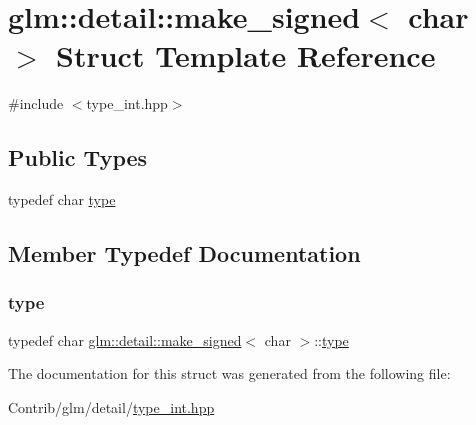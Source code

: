 \hypertarget{structglm_1_1detail_1_1make__signed_3_01char_01_4}{}\section{glm\+:\+:detail\+:\+:make\+\_\+signed$<$ char $>$ Struct Template Reference}
\label{structglm_1_1detail_1_1make__signed_3_01char_01_4}


{\ttfamily \#include $<$type\+\_\+int.\+hpp$>$}

\subsection*{Public Types}
\begin{DoxyCompactItemize}
\item 
typedef char \mbox{\hyperlink{structglm_1_1detail_1_1make__signed_3_01char_01_4_ad92111512e0af83393df0905896d478f}{type}}
\end{DoxyCompactItemize}


\subsection{Member Typedef Documentation}
\mbox{\label{structglm_1_1detail_1_1make__signed_3_01char_01_4_ad92111512e0af83393df0905896d478f}} 
\subsubsection{\texorpdfstring{type}{type}}
{\footnotesize\ttfamily typedef char \mbox{\hyperlink{structglm_1_1detail_1_1make__signed}{glm\+::detail\+::make\+\_\+signed}}$<$ char $>$\+::\mbox{\hyperlink{structglm_1_1detail_1_1make__signed_3_01char_01_4_ad92111512e0af83393df0905896d478f}{type}}}



The documentation for this struct was generated from the following file\+:\begin{DoxyCompactItemize}
\item 
Contrib/glm/detail/\mbox{\hyperlink{type__int_8hpp}{type\+\_\+int.\+hpp}}\end{DoxyCompactItemize}
